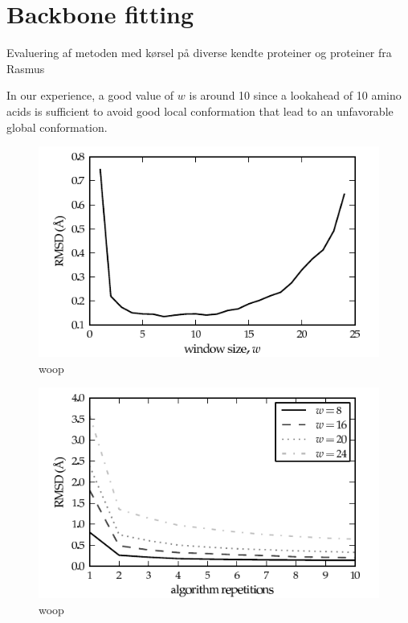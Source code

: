 
\section{Backbone fitting}

Evaluering af metoden med kørsel på diverse kendte proteiner og
proteiner fra Rasmus

In our experience, a good value of $w$ is around 10 since a lookahead of 10 amino acids is sufficient to avoid good local conformation that lead to an unfavorable global conformation.
\begin{figure}
	\centering
	\hspace*{-3.5mm}\includegraphics[width=1.1\columnwidth]{figures/plot_rmsd}
	\caption{woop}
\end{figure}

\begin{figure}
	\centering
	\hspace*{-3.5mm}\includegraphics[width=1.1\columnwidth]{figures/plot_rmsd_convergence}
	\caption{woop}
\end{figure}


